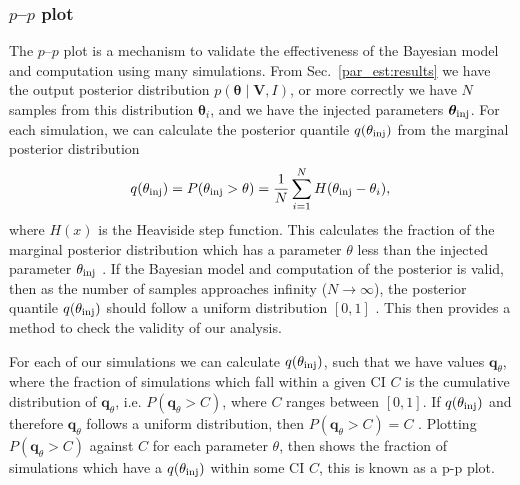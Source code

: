 \subsubsection{\label{par_est:results:simulations:ppplot}$p$--$p$ plot}

The $p$--$p$ plot is a
mechanism to validate the effectiveness of the Bayesian model and computation
using many simulations.  From Sec.~\ref{par_est:results} we have the output
posterior distribution $p(\bm{\theta} \mid \bm{V}, I)$, or more correctly we
have $N$ samples from this distribution $\bm{\theta}_i$, and we have the
injected parameters $\bm{\theta}_{\rm{inj}}$.  For each simulation, we can
calculate the posterior quantile $q(\theta_{\rm{inj}})$ from the marginal
posterior distribution
%
\begin{equation}
    q(\theta_{\rm{inj}}) = P(\theta_{\rm{inj}} > \theta) = \frac{1}{N} \sum_{i=1}^{N} H(\theta_{\rm{inj}} - \theta_i),
\end{equation}
%
where $H(x)$ is the Heaviside step function.  This calculates the fraction of
the marginal posterior distribution which has a parameter $\theta$ less than
the injected parameter $\theta_{\rm{inj}}$ \citep{cook2006ValidationSoftware}.
If the Bayesian model and computation of the posterior is valid, then as the
number of samples approaches infinity ($N \rightarrow \infty$), the posterior
quantile $q(\theta_{\rm{inj}})$ should follow a uniform distribution $[0,1]$
\citep{cook2006ValidationSoftware}.  This then provides a method to check the
validity of our analysis.

For each of our simulations we can calculate $q(\theta_{\rm{inj}})$, such that
we have values $\bm{q}_{\theta}$, where the fraction of simulations which fall
within a given \gls{CI} $C$ is the cumulative distribution of
$\bm{q}_{\theta}$, i.e. $P(\bm{q}_{\theta} > C)$, where $C$ ranges between
$[0,1]$.  If $q(\theta_{\rm{inj}})$ and therefore $\bm{q}_{\theta}$ follows a
uniform distribution, then $P(\bm{q}_{\theta} > C) = C$ \citep{cook2006ValidationSoftware}.
Plotting $P(\bm{q}_{\theta} > C)$ against $C$ for each parameter $\theta$, then
shows the fraction of simulations which have a $q(\theta_{\rm{inj}})$ within
some \gls{CI} $C$, this is known as a p-p plot.

